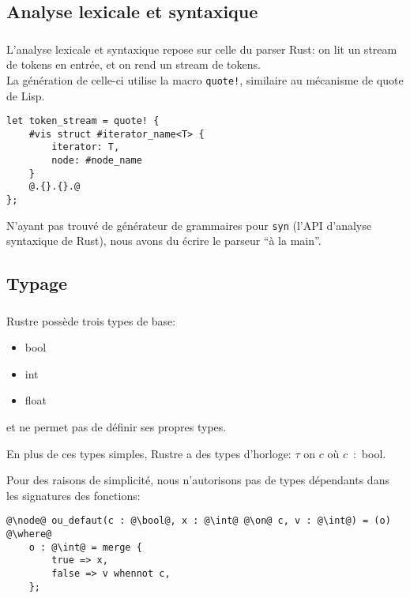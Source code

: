 \documentclass[professionalfonts]{beamer}
\makeatletter
\newcommand*{\currentname}{\@currentlabelname}
\newcommand{\type}[1]{{\color{blue}#1}}
\renewcommand{\int}{\type{int}}
\newcommand{\bool}{\type{bool}}
\newcommand{\float}{\type{float}}
\newcommand{\on}{\type{on}}
\makeatother
\begin{document}
\subsection{Analyse lexicale et syntaxique}
\begin{frame}[fragile]
  \frametitle{\currentname}

  L'analyse lexicale et syntaxique repose sur celle du parser Rust: on lit un stream de tokens en
  entrée, et on rend un stream de tokens.\pause\\
  La génération de celle-ci utilise la macro \texttt{quote!}, similaire au mécanisme de
  quote de Lisp.\pause
  \begin{verbatim}
let token_stream = quote! {
    #vis struct #iterator_name<T> {
        iterator: T,
        node: #node_name
    }
    @.{}.{}.@
};
  \end{verbatim}
  \pause
  N'ayant pas trouvé de générateur de grammaires pour \texttt{syn} (l'API d'analyse
  syntaxique de Rust), nous avons du écrire le parseur ``à la main''.
\end{frame}

\subsection{Typage}
\begin{frame}[fragile]
  \frametitle{\currentname}

  Rustre possède trois types de base:
  \begin{itemize}
  \item \bool
  \item \int
  \item \float
  \end{itemize}
  et ne permet pas de définir ses propres types.\pause\par
  En plus de ces types simples, Rustre a des types d'horloge: \(\tau\) \on{} \(c\) où
  \(c\)~:~\bool.\pause\par
  Pour des raisons de simplicité, nous n'autorisons pas de types dépendants dans les signatures
  des fonctions:
  \vspace*{-1em}
  \begin{verbatim}
@\node@ ou_defaut(c : @\bool@, x : @\int@ @\on@ c, v : @\int@) = (o)
@\where@
    o : @\int@ = merge {
        true => x,
        false => v whennot c,
    };
  \end{verbatim}
\end{frame}
\end{document}
